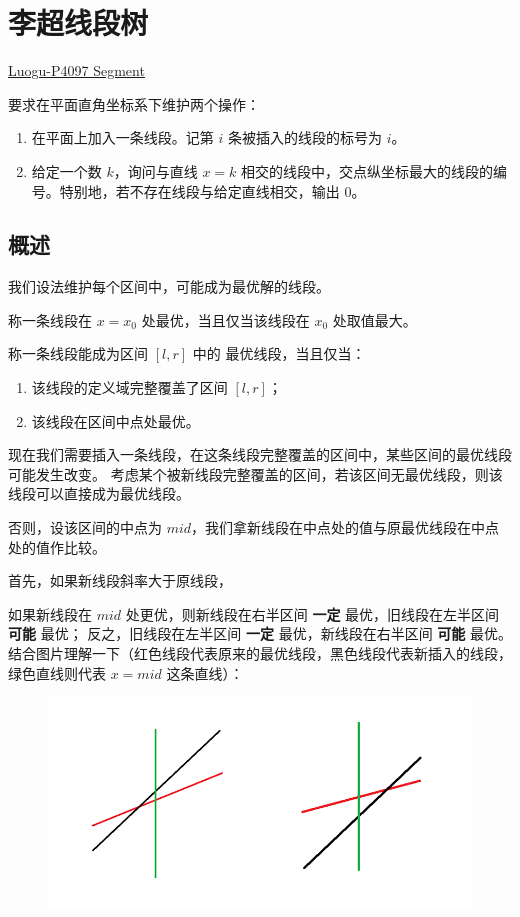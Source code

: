 \section{李超线段树}
	\href{https://oi-wiki.org/ds/li-chao-tree/}{Luogu-P4097 Segment} \par 
	要求在平面直角坐标系下维护两个操作：\par
	\begin{enumerate}
		\item 在平面上加入一条线段。记第 $i$ 条被插入的线段的标号为 $i$。
		\item 给定一个数 $k$，询问与直线 $x = k$ 相交的线段中，交点纵坐标最大的线段的编号。特别地，若不存在线段与给定直线相交，输出 $0$。
	\end{enumerate}
\subsection{概述}
我们设法维护每个区间中，可能成为最优解的线段。

称一条线段在 $x=x_0$ 处最优，当且仅当该线段在 $x_0$ 处取值最大。

称一条线段能成为区间 $[l,r]$ 中的 最优线段，当且仅当：
\begin{enumerate}
	\item 该线段的定义域完整覆盖了区间 $[l, r]$；
	\item 该线段在区间中点处最优。
\end{enumerate}
现在我们需要插入一条线段，在这条线段完整覆盖的区间中，某些区间的最优线段可能发生改变。
考虑某个被新线段完整覆盖的区间，若该区间无最优线段，则该线段可以直接成为最优线段。

否则，设该区间的中点为 $mid$，我们拿新线段在中点处的值与原最优线段在中点处的值作比较。

首先，如果新线段斜率大于原线段，

如果新线段在 $mid$ 处更优，则新线段在右半区间 \textbf{一定}  最优，旧线段在左半区间 \textbf{可能}  最优；
反之，旧线段在左半区间 \textbf{一定}  最优，新线段在右半区间 \textbf{可能}  最优。
结合图片理解一下（红色线段代表原来的最优线段，黑色线段代表新插入的线段，绿色直线则代表 $x=mid$ 这条直线）：
\begin{figure}[htbp]
	\centering
	\includegraphics[scale = 0.5]{./image/li-chao-tree1.png}
\end{figure}

